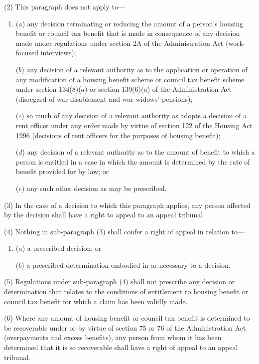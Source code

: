 \documentclass[12pt,a4paper]{article}
\begin{document}
(2) This paragraph does not apply to—
\begin{enumerate}\item[]
($a$) any decision terminating or reducing the amount of a person’s housing benefit or council tax benefit that is made in consequence of any decision made under regulations under section 2A of the Administration Act (work-focused interviews);

($b$) any decision of a relevant authority as to the application or operation of any modification of a housing benefit scheme or council tax benefit scheme under section 134(8)($a$)  or section 139(6)($a$)  of the Administration Act (disregard of war disablement and war widows' pensions);

($c$) so much of any decision of a relevant authority as adopts a decision of a rent officer under any order made by virtue of section 122 of the Housing Act 1996 (decisions of rent officers for the purposes of housing benefit);

($d$) any decision of a relevant authority as to the amount of benefit to which a person is entitled in a case in which the amount is determined by the rate of benefit provided for by law; or

($e$) any such other decision as may be prescribed.
\end{enumerate}

(3) In the case of a decision to which this paragraph applies, any person affected by the decision shall have a right to appeal to an appeal tribunal.

(4) Nothing in sub-paragraph (3)  shall confer a right of appeal in relation to—
\begin{enumerate}\item[]
($a$) a prescribed decision; or

($b$) a prescribed determination embodied in or necessary to a decision.
\end{enumerate}

(5) Regulations under sub-paragraph (4)  shall not prescribe any decision or determination that relates to the conditions of entitlement to housing benefit or council tax benefit for which a claim has been validly made.

(6) Where any amount of housing benefit or council tax benefit is determined to be recoverable under or by virtue of section 75 or 76 of the Administration Act (overpayments and excess benefits), any person from whom it has been determined that it is so recoverable shall have a right of appeal to an appeal tribunal.
\end{document}

